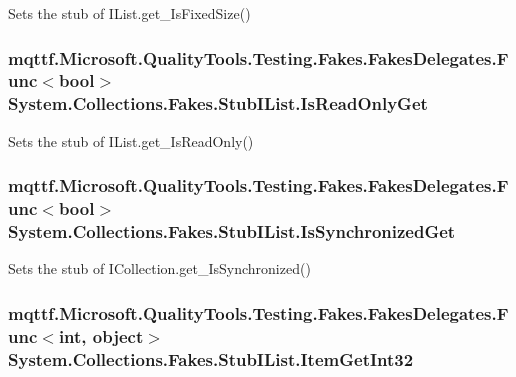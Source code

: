 Sets the stub of I\-List.\-get\-\_\-\-Is\-Fixed\-Size()

\hypertarget{class_system_1_1_collections_1_1_fakes_1_1_stub_i_list_a45b3e53e965bf56e518d428850890cb1}{
\subsubsection[{Is\-Read\-Only\-Get}]{\setlength{\rightskip}{0pt plus 5cm}mqttf.\-Microsoft.\-Quality\-Tools.\-Testing.\-Fakes.\-Fakes\-Delegates.\-Func$<$bool$>$ System.\-Collections.\-Fakes.\-Stub\-I\-List.\-Is\-Read\-Only\-Get}}\label{class_system_1_1_collections_1_1_fakes_1_1_stub_i_list_a45b3e53e965bf56e518d428850890cb1}


Sets the stub of I\-List.\-get\-\_\-\-Is\-Read\-Only()

\hypertarget{class_system_1_1_collections_1_1_fakes_1_1_stub_i_list_ab48b0f77e4a98b8a3a7fc3a9ff9ebc3e}{
\subsubsection[{Is\-Synchronized\-Get}]{\setlength{\rightskip}{0pt plus 5cm}mqttf.\-Microsoft.\-Quality\-Tools.\-Testing.\-Fakes.\-Fakes\-Delegates.\-Func$<$bool$>$ System.\-Collections.\-Fakes.\-Stub\-I\-List.\-Is\-Synchronized\-Get}}\label{class_system_1_1_collections_1_1_fakes_1_1_stub_i_list_ab48b0f77e4a98b8a3a7fc3a9ff9ebc3e}


Sets the stub of I\-Collection.\-get\-\_\-\-Is\-Synchronized()

\hypertarget{class_system_1_1_collections_1_1_fakes_1_1_stub_i_list_acb0f7d09c7f1dd11fda98c871b3077fa}{
\subsubsection[{Item\-Get\-Int32}]{\setlength{\rightskip}{0pt plus 5cm}mqttf.\-Microsoft.\-Quality\-Tools.\-Testing.\-Fakes.\-Fakes\-Delegates.\-Func$<$int, object$>$ System.\-Collections.\-Fakes.\-Stub\-I\-List.\-Item\-Get\-Int32}}\label{class_system_1_1_collections_1_1_fakes_1_1_stub_i_list_acb0f7d09c7f1dd11fda98c871b3077fa}


